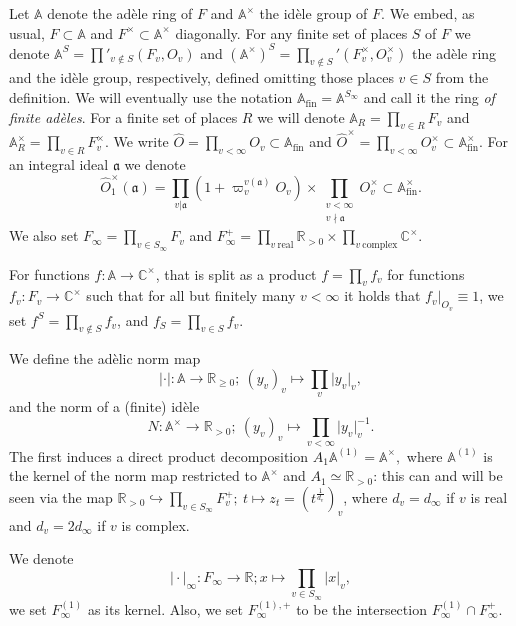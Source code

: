 \documentclass[a4paper,11pt]{amsart}
\theoremstyle{definition}
\newcommand{\A}{\mathbb{A}}
\newcommand{\R}{\mathbb{R}}
\newcommand{\fin}{\text{fin}}
\newcommand{\CC}{\mathbb{C}}
\begin{document}
Let $\A$ denote the adèle ring of $F$ and $\A^{\times}$ the idèle group of $F$. We embed, as usual, $F\subset \A$ and $F^{\times}\subset \A^{\times}$ diagonally. For any finite set of places $S$ of $F$ we denote $\A^{S} = \prod'_{v\notin S}(F_v,O_v)$ and $(\A^{\times})^{S} = \prod_{v\notin S}'(F_v^{\times},O_v^{\times})$ the adèle ring and the idèle group, respectively, defined omitting those places $v\in S$ from the definition. We will eventually use the notation $\A_{\fin} = \A^{S_{\infty}}$ and call it the ring \emph{of finite adèles}. For a finite set of places $R$ we will denote $\A_R = \prod_{v\in R}F_v$ and $\A_{R}^{\times} = \prod_{v\in R}F_v^{\times}$. We write $\widehat{O} = \prod_{v<\infty}O_{v}\subset \A_{\fin}$ and $\widehat{O}^{\times} = \prod_{v<\infty}O_{v}^{\times}\subset \A_{\fin}^{\times}$. 
 For an integral ideal $\mathfrak{a}$ we denote \[\widehat{O}^{\times}_{1}(\mathfrak{a}) =  \prod_{v|\mathfrak{a}}\left(1+\varpi_v^{v(\mathfrak{a})}O_{v}\right) \times \prod_{\substack{v<\infty\\v\nmid \mathfrak{a}}}O_v^{\times} \subset \A_{\fin}^{\times}.\]
 We also set $F_{\infty} = \prod_{v\in S_\infty}F_v$ and $F^{+}_{\infty} = \prod_{v\ \text{real}}\R_{>0} \times \prod_{v\ \text{complex}}\CC^{\times}$.

For functions $f\colon \A \to \CC^{\times}$, that is split as a product $f = \prod_vf_v$ for functions $f_v\colon F_v\to \CC^{\times}$ such that for all but finitely many $v<\infty$ it holds that $f_v|_{O_v}\equiv 1$, we set $f^S = \prod_{v\notin S}f_v$, and $f_S = \prod_{v\in S}f_v$. 


We define the adèlic norm map \[\vert{\cdot}\vert\colon \A \to \R_{\geq 0};\ (y_v)_v\mapsto \prod_v \vert{y_v}\vert_v,\]
and the norm of a (finite) idèle 
\[ N\colon \A^{\times}\to \R_{>0};\ (y_v)_v \mapsto \prod_{v<\infty}\vert{y_v}\vert^{-1}_v.\]
The first induces a direct product decomposition $A_1\A^{(1)} = \A^{\times},$ where $\A^{(1)}$ is the kernel of the norm map restricted to $\A^{\times}$ and $A_1\simeq \R_{>0}$: this can and will be seen via the map $\R_{>0} \hookrightarrow \prod_{v \in S_{\infty}}F_v^{+};\ t \mapsto z_t=(t^{\frac{1}{d_v}})_v$, where $d_v=d_{\infty}$ if $v$ is real and $d_v=2d_{\infty}$ if $v$ is complex. 

We denote \[\vert{\cdot }\vert_{\infty} \colon F_{\infty} \to \R; x \mapsto \prod_{v\in S_{\infty}}\vert{x}\vert_v,\] we set
$F_{\infty}^{(1)}$ as its kernel. Also, we set $F_{\infty}^{(1),+}$ to be the intersection $F^{(1)}_{\infty}\cap F_{\infty}^+$. 
\end{document}
